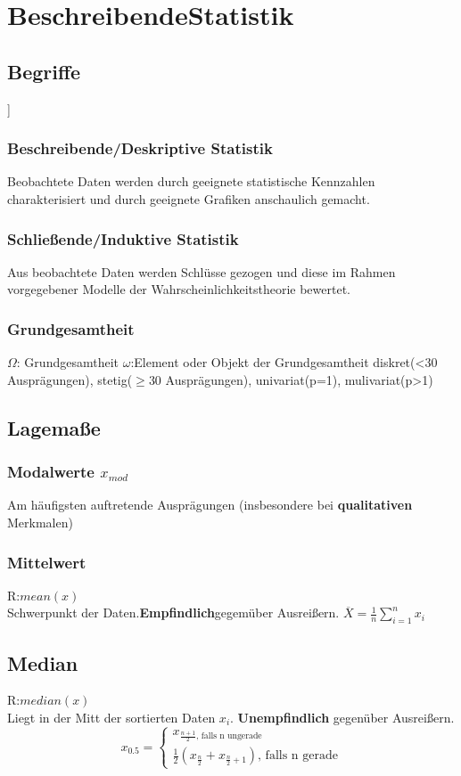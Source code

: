 \section{BeschreibendeStatistik}
  \subsection{Begriffe}]
    \subsubsection{Beschreibende/Deskriptive Statistik}
    Beobachtete Daten werden durch geeignete statistische Kennzahlen charakterisiert und durch geeignete Grafiken anschaulich gemacht.
    \subsubsection{Schließende/Induktive Statistik}
    Aus beobachtete Daten werden Schlüsse gezogen und diese im Rahmen vorgegebener Modelle der Wahrscheinlichkeitstheorie bewertet.
    \subsubsection{Grundgesamtheit}
    $\Omega$: Grundgesamtheit
    $\omega$:Element oder Objekt der Grundgesamtheit
    diskret(<30 Ausprägungen), stetig($\geq$30 Ausprägungen), univariat(p=1), mulivariat(p>1)
  \subsection{Lagemaße}
    \subsubsection{Modalwerte $x_{mod}$}
    Am häufigsten auftretende Ausprägungen (insbesondere bei \textbf{qualitativen} Merkmalen)
    \subsubsection{Mittelwert}
    R:$mean(x)$\\
    Schwerpunkt der Daten.\textbf{Empfindlich}gegemüber Ausreißern.
    $\overline{X} = \frac{1}{n} \sum_{i=1}^{n} x_{i}$
    \subsection{Median}
    R:$median(x)$\\
    Liegt in der Mitt der sortierten Daten $x_{i}$. \textbf{Unempfindlich} gegenüber Ausreißern.
    \begin{equation}
      x_{0.5} =
        \begin{cases}
        	x_{\frac{n+1}{2} \text{, falls n ungerade}}\\
        	\frac{1}{2}(x_{\frac{n}{2}} + x_{\frac{n}{2}+1}) \text{, falls n gerade}
        \end{cases}
    \end{equation}
